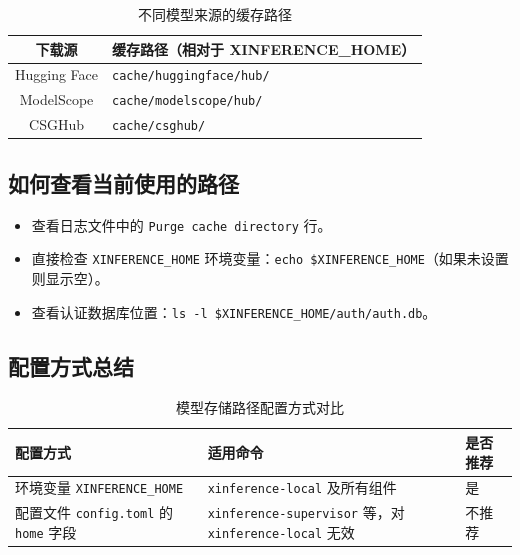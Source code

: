 \documentclass[12pt,UTF8]{ctexbook}
\begin{document}
\begin{table}[htbp]
    \centering
    \caption{不同模型来源的缓存路径}
    \begin{tabular}{|c|p{8cm}|}
        \hline
        \textbf{下载源} & \textbf{缓存路径（相对于 XINFERENCE\_HOME）} \\
        \hline
        Hugging Face & \texttt{cache/huggingface/hub/} \\
        \hline
        ModelScope & \texttt{cache/modelscope/hub/} \\
        \hline
        CSGHub & \texttt{cache/csghub/} \\
        \hline
    \end{tabular}
\end{table}

\subsection{如何查看当前使用的路径}

\begin{itemize}[leftmargin=2cm]
    \item 查看日志文件中的 \texttt{Purge cache directory} 行。
    \item 直接检查 \texttt{XINFERENCE\_HOME} 环境变量：\texttt{echo \$XINFERENCE\_HOME}（如果未设置则显示空）。
    \item 查看认证数据库位置：\texttt{ls -l \$XINFERENCE\_HOME/auth/auth.db}。
\end{itemize}

\subsection{配置方式总结}

\begin{table}[htbp]
    \centering
    \caption{模型存储路径配置方式对比}
    \begin{tabular}{|p{3.5cm}|p{5cm}|p{2cm}|}
        \hline
        \textbf{配置方式} & \textbf{适用命令} & \textbf{是否推荐} \\
        \hline
        环境变量 \texttt{XINFERENCE\_HOME} & \texttt{xinference-local} 及所有组件 & 是 \\
        \hline
        配置文件 \texttt{config.toml} 的 \texttt{home} 字段 & \texttt{xinference-supervisor} 等，对 \texttt{xinference-local} 无效 & 不推荐 \\
        \hline
    \end{tabular}
\end{table}
\end{document}
